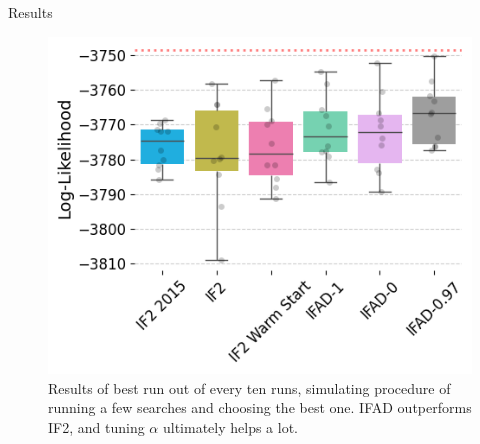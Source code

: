 \documentclass{beamer}
\begin{document}
\begin{frame}{Results}
    
\begin{figure}[H]
    \centering
    \includegraphics[scale=0.5]{imgs/095/boxplot.png}
    \caption{Results of best run out of every ten runs, simulating procedure of running a few searches and choosing the best one. IFAD outperforms IF2, and tuning $\alpha$ ultimately helps a lot.}
    \label{fig:boxplot-search}
\end{figure}

\end{frame}
\end{document}
